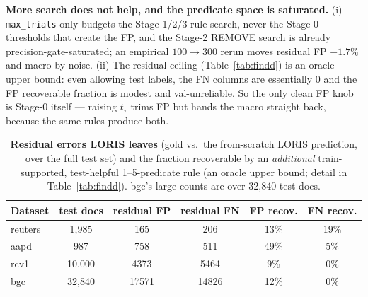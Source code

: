\documentclass[11pt]{article}
\begin{document}
\textbf{More search does not help, and the predicate space is saturated.} (i) \texttt{max\_trials} only
budgets the Stage-1/2/3 rule search, never the Stage-0 thresholds that create the FP, and the Stage-2
REMOVE search is already precision-gate-saturated; an empirical $100\!\to\!300$ rerun moves residual FP
$-1.7\%$ and macro by noise. (ii) The residual ceiling (Table~\ref{tab:findd}) is an oracle upper bound:
even allowing test labels, the FN columns are essentially $0$ and the FP recoverable fraction is modest
and val-unreliable. So the only clean FP knob is Stage-0 itself --- raising $t_\tau$ trims FP but hands
the macro straight back, because the same rules produce both.
\begin{table}[h]\centering
\caption{\textbf{Residual errors LORIS leaves} (gold vs.\ the from-scratch LORIS prediction, over the
full test set) and the fraction recoverable by an \emph{additional} train-supported, test-helpful
1--5-predicate rule (an oracle upper bound; detail in Table~\ref{tab:findd}). bgc's large counts are
over 32{,}840 test docs.}
\label{tab:resid}\small
\begin{tabular}{lccccc}
\toprule
Dataset & test docs & residual FP & residual FN & FP recov. & FN recov. \\
\midrule
reuters & 1,985 & 165 & 206 & 13\% & 19\% \\
aapd & 987 & 758 & 511 & 49\% & 5\% \\
rcv1 & 10,000 & 4373 & 5464 & 9\% & 0\% \\
bgc & 32,840 & 17571 & 14826 & 12\% & 0\% \\
\bottomrule
\end{tabular}
\end{table}
\end{document}
